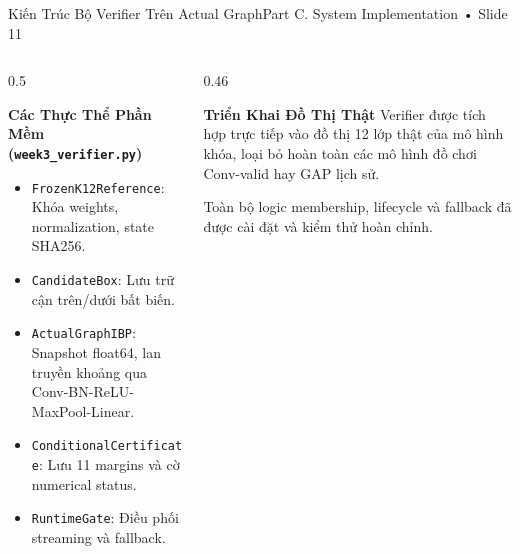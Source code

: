 \documentclass[aspectratio=169, 10pt]{beamer}
\begin{document}
\begin{frame}{Kiến Trúc Bộ Verifier Trên Actual Graph}{Part C. System Implementation • Slide 11}
    \begin{columns}
        \begin{column}{0.5\textwidth}
            \begin{block}{\textbf{Các Thực Thể Phần Mềm (\texttt{week3\_verifier.py})}}
                \footnotesize
                \begin{itemize}
                    \item \texttt{FrozenK12Reference}: Khóa weights, normalization, state SHA256.
                    \item \texttt{CandidateBox}: Lưu trữ cận trên/dưới bất biến.
                    \item \texttt{ActualGraphIBP}: Snapshot float64, lan truyền khoảng qua Conv-BN-ReLU-MaxPool-Linear.
                    \item \texttt{ConditionalCertificate}: Lưu 11 margins và cờ numerical status.
                    \item \texttt{RuntimeGate}: Điều phối streaming và fallback.
                \end{itemize}
            \end{block}
        \end{column}
        \begin{column}{0.46\textwidth}
            \begin{alertblock}{\textbf{Triển Khai Đồ Thị Thật}}
                \footnotesize
                Verifier được tích hợp trực tiếp vào đồ thị 12 lớp thật của mô hình khóa, loại bỏ hoàn toàn các mô hình đồ chơi Conv-valid hay GAP lịch sử.
            \end{alertblock}
            \vspace{0.2cm}
            \footnotesize
            Toàn bộ logic membership, lifecycle và fallback đã được cài đặt và kiểm thử hoàn chỉnh.
        \end{column}
    \end{columns}
\end{frame}
\end{document}
